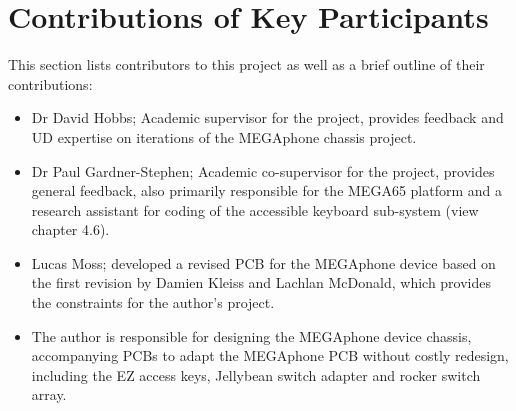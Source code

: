 \section{Contributions of Key Participants} %

This section lists contributors to this project as well as a brief outline of their contributions:

\begin{itemize} 
    \item Dr David Hobbs; Academic supervisor for the project, provides feedback and UD expertise on iterations of the MEGAphone chassis project.
    \item Dr Paul Gardner-Stephen; Academic co-supervisor for the project, provides general feedback, also primarily responsible for the MEGA65 platform and a research assistant for coding of the accessible keyboard sub-system (view chapter 4.6).
    \item Lucas Moss; developed a revised PCB for the MEGAphone device based on the first revision by Damien Kleiss and Lachlan McDonald, which provides the constraints for the author's project.
    \item The author is responsible for designing the MEGAphone device chassis, accompanying PCBs to adapt the MEGAphone PCB without costly redesign, including the EZ access keys, Jellybean switch adapter and rocker switch array.
\end{itemize}

